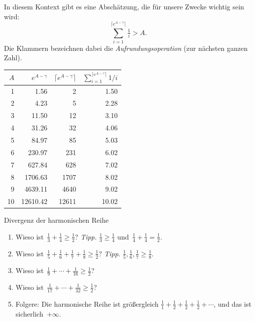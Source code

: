 \documentclass[twoside]{../zirkelblatt1415}
\theoremstyle{definition}
\theoremstyle{plain}
\theoremstyle{remark}
\begin{document}
In diesem Kontext gibt es eine Abschätzung, die für unsere Zwecke wichtig sein wird:
\[ \sum_{i=1}^{\lceil e^{A-\gamma} \rceil} \tfrac{1}{i} > A. \]
Die Klammern bezeichnen dabei die \emph{Aufrundungsoperation} (zur nächsten
ganzen Zahl).

\begin{center}\begin{tabular}{rrrr}
  \toprule
  $A$ & $e^{A-\gamma}$ & $\lceil e^{A-\gamma} \rceil$ & $\sum_{i=1}^{\lceil e^{A-\gamma} \rceil} 1/i$ \\\midrule
   1 &     1.56 &     2 &  1.50 \\
   2 &     4.23 &     5 &  2.28 \\
   3 &    11.50 &    12 &  3.10 \\
   4 &    31.26 &    32 &  4.06 \\
   5 &    84.97 &    85 &  5.03 \\
   6 &   230.97 &   231 &  6.02 \\
   7 &   627.84 &   628 &  7.02 \\
   8 &  1706.63 &  1707 &  8.02 \\
   9 &  4639.11 &  4640 &  9.02 \\
  10 & 12610.42 & 12611 & 10.02 \\
  \bottomrule
\end{tabular}\end{center}

\begin{aufgabe}{Divergenz der harmonischen Reihe}
\begin{enumerate}
\item Wieso ist~$\frac{1}{3} + \frac{1}{4} \geq \frac{1}{2}$?
\tabto{6cm}
\emph{Tipp.} $\frac{1}{3} \geq \frac{1}{4}$ und~$\frac{1}{4} + \frac{1}{4} =
\frac{1}{2}$.
\item Wieso ist~$\frac{1}{5} + \frac{1}{6} + \frac{1}{7} + \frac{1}{8} \geq \frac{1}{2}$?
\tabto{6cm}
\emph{Tipp.} $\frac{1}{5}, \frac{1}{6}, \frac{1}{7} \geq \frac{1}{8}$.

\item Wieso ist~$\frac{1}{9} + \cdots + \frac{1}{16} \geq \frac{1}{2}$?

\item Wieso ist~$\frac{1}{17} + \cdots + \frac{1}{32} \geq \frac{1}{2}$?

\item Folgere: Die harmonische Reihe ist größergleich
$\frac{1}{1} + \frac{1}{2} + \frac{1}{2} + \frac{1}{2} + \cdots$,
und das ist sicherlich~$+\infty$.
\end{enumerate}\fixlistspacing
\end{aufgabe}
\end{document}
